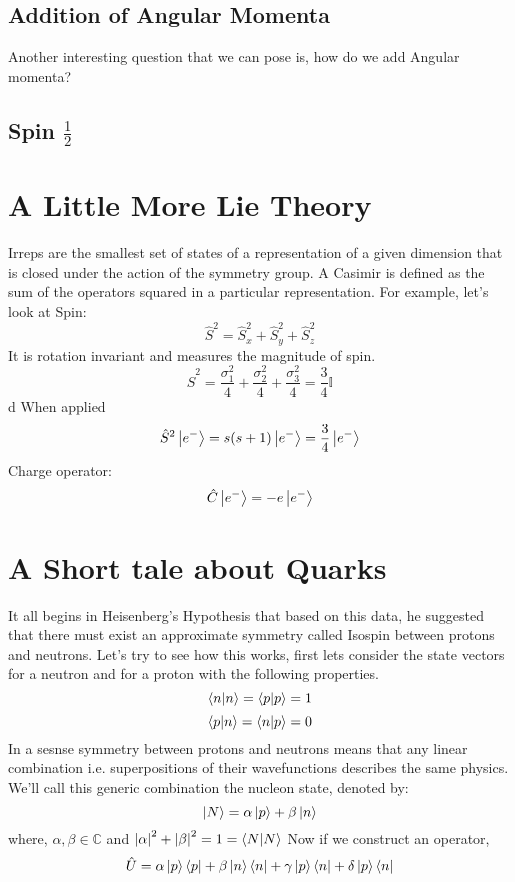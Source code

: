 \documentclass[]{article}
\begin{document}
\subsection{Addition of Angular Momenta}
Another interesting question that we can pose is, how do we add Angular momenta? 
\subsection{Spin $\frac{1}{2}$}

\section{A Little More Lie Theory}
Irreps are the smallest set of states of a representation of a given dimension that is closed under the action of the symmetry group. A Casimir is defined as the sum of the operators squared in a particular representation. For example, let's look at Spin:
\begin{equation}
\hat{S}^{2} = \hat{S}_{x}^{2} + \hat{S}_{y}^{2} + \hat{S}_{z}^{2}
\end{equation}
It is rotation invariant and measures the magnitude of spin.
\begin{equation}
\hat{S}^{2} = \frac{\sigma^{2}_{1}}{4} + \frac{\sigma^{2}_{2}}{4} + \frac{\sigma^{2}_{3}}{4} = \frac{3}{4} \mathbb{I}
\end{equation}d
When applied 
\begin{equation}
\hat{S}^{2} \ket{e^{-}} = s(s+1) \ket{e^{-}} = \frac{3}{4} \ket{e^{-}}
\end{equation}
Charge operator:
\begin{equation}
\hat{C} \ket{e^{-}} = - e \ket{e^{-}}
\end{equation}
\section{A Short tale about Quarks}
It all begins in Heisenberg's Hypothesis that based on this data,
he suggested that there must exist an approximate symmetry called Isospin between protons and neutrons. Let's try to see how this works, first lets consider the state vectors for a neutron and for a proton with the following properties.
\begin{equation}
\braket{n}{n} = \braket{p}{p} = 1
\end{equation}
\begin{equation}
\braket{p}{n} = \braket{n}{p} = 0
\end{equation}
In a sesnse symmetry between protons and neutrons means that any linear combination i.e. superpositions of their wavefunctions describes the same physics. We'll call this generic combination the nucleon state, denoted by:
\begin{equation}
\ket{N} = \alpha \ket{p} +  \beta \ket{n}
\end{equation}
where, $\alpha, \beta \in \mathbb{C}$ and $\abs{\alpha}^{2} + \abs{\beta}^{2} = 1 = \braket{N}{N}$
Now if we construct an operator,
\begin{equation}
\hat{U} = \alpha \ket{p} \bra{p} + \beta \ket{n} \bra{n} + \gamma \ket{p} \bra{n} + \delta \ket{p} \bra{n}
\end{equation}
\end{document}
